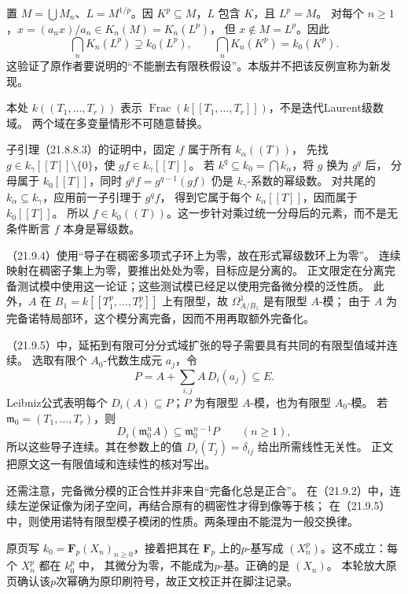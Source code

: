 置 $M=\bigcup M_n$、$L=M^{1/p}$。因 $K^p\subseteq M$，$L$ 包含 $K$，且 $L^p=M$。
对每个 $n\ge1$，$x=(a_nx)/a_n\in K_n(M)=K_n(L^p)$，
但 $x\notin M=L^p$。因此
\[
 \bigcap_nK_n(L^p)\supsetneq k_0(L^p),
 \qquad \bigcap_nK_n(K^p)=k_0(K^p).
\]
这验证了原作者要说明的“不能删去有限秩假设”。本版并不把该反例宣称为新发现。

本处 $k((T_1,\ldots,T_r))$ 表示
$\operatorname{Frac}(k[[T_1,\ldots,T_r]])$，不是迭代Laurent级数域。
两个域在多变量情形不可随意替换。

子引理（21.8.8.3）的证明中，固定 $f$ 属于所有 $k_\alpha((T))$，
先找 $g\in k_\gamma[[T]]\setminus\{0\}$，使 $gf\in k_\gamma[[T]]$。
若 $k^q\subseteq k_0=\bigcap k_\alpha$，将 $g$ 换为 $g^q$ 后，
分母属于 $k_0[[T]]$，同时 $g^qf=g^{q-1}(gf)$ 仍是 $k_\gamma$-系数的幂级数。
对共尾的 $k_\alpha\subseteq k_\gamma$，应用前一子引理于 $g^qf$，
得到它属于每个 $k_\alpha[[T]]$，因而属于 $k_0[[T]]$。
所以 $f\in k_0((T))$。这一步针对乘过统一分母后的元素，而不是无条件断言 $f$ 本身是幂级数。

（21.9.4）使用“导子在稠密多项式子环上为零，故在形式幂级数环上为零”。
连续映射在稠密子集上为零，要推出处处为零，目标应是分离的。
正文限定在分离完备测试模中使用这一论证；这些测试模已经足以使用完备微分模的泛性质。
此外，$A$ 在 $B_1=k[[T_1^p,\ldots,T_r^p]]$ 上有限型，故 $\Omega^1_{A/B_1}$ 是有限型 $A$-模；
由于 $A$ 为完备诺特局部环，这个模分离完备，因而不用再取额外完备化。

（21.9.5）中，延拓到有限可分分式域扩张的导子需要具有共同的有限型值域并连续。
选取有限个 $A_0$-代数生成元 $a_j$，令
\[
 P=A+\sum_{i,j}A\,D_i(a_j)\subseteq E.
\]
Leibniz公式表明每个 $D_i(A)\subseteq P$；$P$ 为有限型 $A$-模，也为有限型 $A_0$-模。
若 $\mathfrak m_0=(T_1,\ldots,T_r)$，则
\[
 D_i(\mathfrak m_0^nA)\subseteq\mathfrak m_0^{n-1}P\qquad(n\ge1),
\]
所以这些导子连续。其在参数上的值 $D_i(T_j)=\delta_{ij}$ 给出所需线性无关性。
正文把原文这一有限值域和连续性的核对写出。

还需注意，完备微分模的正合性并非来自“完备化总是正合”。
在（21.9.2）中，连续左逆保证像为闭子空间，再结合原有的稠密性才得到像等于核；
在（21.9.5）中，则使用诺特有限型模子模闭的性质。两条理由不能混为一般交换律。

原页写 $k_0=\mathbf F_p(X_n)_{n\ge0}$，接着把其在 $\mathbf F_p$ 上的$p$-基写成
$(X_n^p)$。这不成立：每个 $X_n^p$ 都在 $k_0^p$ 中，
其微分为零，不能成为$p$-基。正确的是 $(X_n)$。
本轮放大原页确认该$p$次幂确为原印刷符号，故正文校正并在脚注记录。

